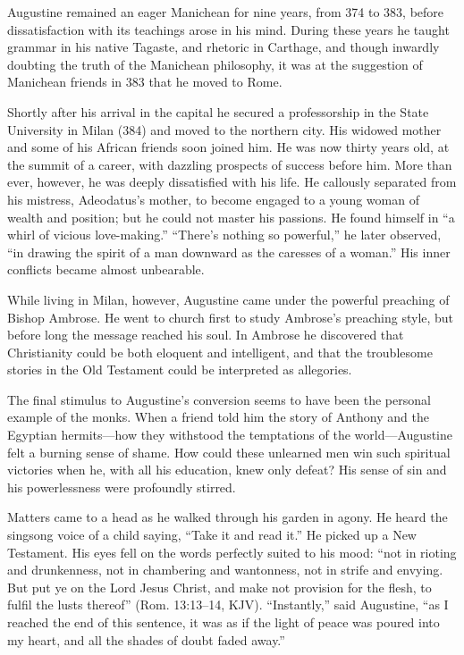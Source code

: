 Augustine remained an eager Manichean for nine years, from 374 to 383, before dissatisfaction with
its teachings arose in his mind. During these years he taught grammar in his native Tagaste, and
rhetoric in Carthage, and though inwardly doubting the truth of the Manichean philosophy, it was at
the suggestion of Manichean friends in 383 that he moved to Rome.

Shortly after his arrival in the capital he secured a professorship in the State University in Milan
(384) and moved to the northern city. His widowed mother and some of his African friends soon joined
him. He was now thirty years old, at the summit of a career, with dazzling prospects of success
before him. More than ever, however, he was deeply dissatisfied with his life. He callously
separated from his mistress, Adeodatus’s mother, to become engaged to a young woman of wealth and
position; but he could not master his passions. He found himself in “a whirl of vicious
love-making.” “There’s nothing so powerful,” he later observed, “in drawing the spirit of a man
downward as the caresses of a woman.” His inner conflicts became almost unbearable.

While living in Milan, however, Augustine came under the powerful preaching of Bishop Ambrose. He
went to church first to study Ambrose’s preaching style, but before long the message reached his
soul. In Ambrose he discovered that Christianity could be both eloquent and intelligent, and that
the troublesome stories in the Old Testament could be interpreted as allegories.

The final stimulus to Augustine’s conversion seems to have been the personal example of the monks.
When a friend told him the story of Anthony and the Egyptian hermits—how they withstood the
temptations of the world—Augustine felt a burning sense of shame. How could these unlearned men win
such spiritual victories when he, with all his education, knew only defeat? His sense of sin and his
powerlessness were profoundly stirred.

Matters came to a head as he walked through his garden in agony. He heard the singsong voice of a
child saying, “Take it and read it.” He picked up a New Testament. His eyes fell on the words
perfectly suited to his mood: “not in rioting and drunkenness, not in chambering and wantonness, not
in strife and envying. But put ye on the Lord Jesus Christ, and make not provision for the flesh, to
fulfil the lusts thereof” (Rom. 13:13–14, KJV). “Instantly,” said Augustine, “as I reached the end
of this sentence, it was as if the light of peace was poured into my heart, and all the shades of
doubt faded away.”

